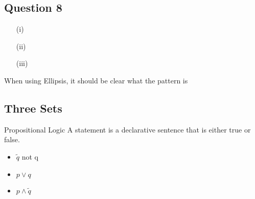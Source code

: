 \subsection*{Question 8}
\begin{itemize}

\item[(i)] 

\item[(ii)]

\item[(iii)]

\end{itemize}





   





When using Ellipsis, it should be clear what the pattern is













\subsection*{ Three Sets }






Propositional Logic A statement is a declarative sentence that
is either true or false.
\begin{itemize}
\item $\tilde q$ not q \item $p \vee q$ \item $p \wedge \tilde
q$
\end{itemize}




